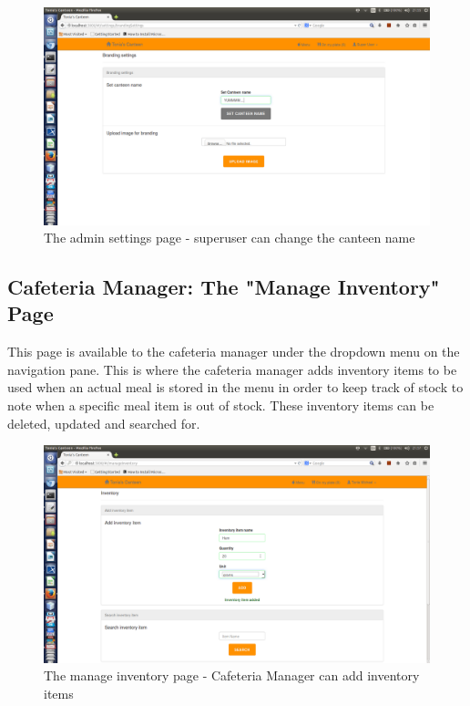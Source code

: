 \documentclass[a4paper,12pt]{report}
\begin{document}
\begin{figure}[H]
  \centering
    \includegraphics[width=1.0\textwidth]{screenshots/canteenName.png}
    \caption{The admin settings page - superuser can change the canteen name}
\end{figure}

\subsection{Cafeteria Manager: The "Manage Inventory" Page}
This page is available to the cafeteria manager under the dropdown menu on the navigation pane. This is where the cafeteria manager adds inventory items to be used when an actual meal is stored in the menu in order to keep track of stock to note when a specific meal item is out of stock. These inventory items can be deleted, updated and searched for.

\begin{figure}[H]
  \centering
    \includegraphics[width=1.0\textwidth]{screenshots/addInv.png}
    \caption{The manage inventory page - Cafeteria Manager can add inventory items}
\end{figure}
\end{document}
